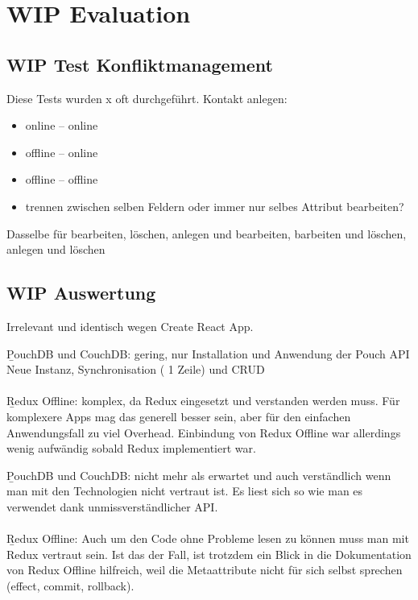 \chapter{\label{chap:evaluation}WIP Evaluation}
%
\section{WIP Test Konfliktmanagement}
Diese Tests wurden x oft durchgeführt.
Kontakt anlegen:
\begin{itemize}
	\item online -- online
	\item offline -- online
	\item offline -- offline
	\item trennen zwischen selben Feldern oder immer nur selbes Attribut bearbeiten?
\end{itemize}
Dasselbe für bearbeiten, löschen,
anlegen und bearbeiten, barbeiten und löschen, anlegen und löschen\\

%
%
\section{WIP Auswertung}
\begin{description}[leftmargin=0.7cm,style=nextline]
\item[Setup der App:] 
Irrelevant und identisch wegen Create React App.\\
\item[Einbinding der Technologien:] 
\b{PouchDB und CouchDB:} gering, nur Installation und Anwendung der Pouch API\\
Neue Instanz, Synchronisation ( 1 Zeile) und CRUD\\\\
\b{Redux Offline:} komplex, da Redux eingesetzt und verstanden werden muss. Für komplexere Apps mag das generell besser sein, aber für den einfachen Anwendungsfall zu viel Overhead. Einbindung von Redux Offline war allerdings wenig aufwändig sobald Redux implementiert war.\\
\item[Lesbarkeit des Codes:] 
\b{PouchDB und CouchDB:} nicht mehr als erwartet und auch verständlich wenn man mit den Technologien nicht vertraut ist. Es liest sich so wie man es verwendet dank unmissverständlicher API.\\\\
\b{Redux Offline:} Auch um den Code ohne Probleme lesen zu können muss man mit Redux vertraut sein. Ist das der Fall, ist trotzdem ein Blick in die Dokumentation von Redux Offline hilfreich, weil die Metaattribute nicht für sich selbst sprechen (effect, commit, rollback).\\
\end{description}
%
%
